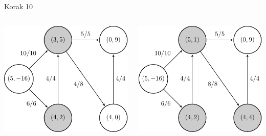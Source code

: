\documentclass{beamer}
\begin{document}
\begin{frame}{Korak 10}
    \begin{columns}
        \begin{column}{0.5\textwidth}
            \centering
            \includegraphics[scale=0.7]{../writing/images/graf2-11.pdf}
        \end{column}
        \pause
        \begin{column}{0.5\textwidth}
            \centering
            \includegraphics[scale=0.7]{../writing/images/graf2-12.pdf}
        \end{column}
    \end{columns}
\end{frame}
\end{document}

